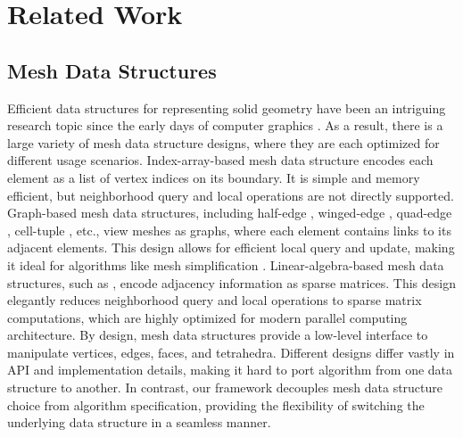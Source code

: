 \section{Related Work}
\label{wmtk:sec:related}

\subsection{Mesh Data Structures}

Efficient data structures for representing solid geometry have been an intriguing
research topic since the early days of computer graphics \cite{Requicha1980}. As
a result, there is a large variety of mesh data structure designs, where they
are each optimized for different usage scenarios. Index-array-based mesh data
structure encodes each element as a list of vertex indices on its
boundary.  It is simple and memory efficient, but neighborhood query and local
operations are not directly supported.
Graph-based mesh data structures, including half-edge \cite{Maentylae1987},
winged-edge \cite{Baumgart1972}, quad-edge \cite{Guibas1985}, cell-tuple
\cite{Brisson1989}, etc., view meshes as graphs, where each element contains
links to its adjacent elements. This design allows for efficient local query
and update, making it ideal for algorithms like mesh simplification
\cite{garland1997surface}. Linear-algebra-based mesh data structures, such as
\cite{Dicarlo2014,Zayer2017,Mahmoud2021}, encode adjacency information as sparse
matrices.  This design elegantly reduces neighborhood query and local operations
to sparse matrix computations, which are highly optimized for modern parallel
computing architecture. 
%
By design, mesh data structures provide a low-level interface to
manipulate vertices, edges, faces, and tetrahedra.
Different designs differ vastly in API and implementation details, making it hard to port algorithm from one data structure to another. In contrast, our framework decouples mesh data structure choice from algorithm specification, providing the flexibility of switching the underlying data structure in a seamless manner.







